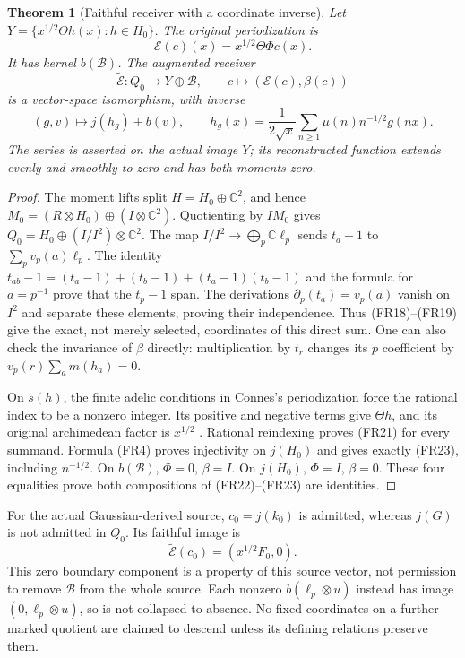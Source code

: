 \documentclass[11pt]{article}
\newtheorem{theorem}{Theorem}
\newcommand{\C}{\mathbb C}\newcommand{\R}{\mathbb R}
\begin{document}
\begin{theorem}[Faithful receiver with a coordinate inverse]
Let $Y=\{x^{1/2}\Theta h(x):h\in H_0\}$. The original periodization is
\begin{equation}
 \mathcal E(c)(x)=x^{1/2}\Theta\Phi c(x).
 \tag{FR21}
\end{equation}
It has kernel $b(\mathcal B)$. The augmented receiver
\begin{equation}
 \widetilde{\mathcal E}:Q_0\longrightarrow Y\oplus\mathcal B,
 \qquad c\longmapsto(\mathcal E(c),\beta(c))
 \tag{FR22}
\end{equation}
is a vector-space isomorphism, with inverse
\begin{equation}
 (g,v)\longmapsto j(h_g)+b(v),\qquad
 h_g(x)=\frac{1}{2\sqrt{x}}\sum_{n\geq1}\mu(n)n^{-1/2}g(nx).
 \tag{FR23}
\end{equation}
The series is asserted on the actual image $Y$; its reconstructed function extends evenly and smoothly to zero and has both moments zero.
\end{theorem}
\begin{proof}
The moment lifts split $H=H_0\oplus\C^2$, and hence
$M_0=(R\otimes H_0)\oplus(I\otimes\C^2)$. Quotienting by $IM_0$ gives
$Q_0=H_0\oplus(I/I^2)\otimes\C^2$.
The map $I/I^2\to\bigoplus_p\C\ell_p$ sends $t_a-1$ to $\sum_pv_p(a)\ell_p$.
The identity $t_{ab}-1=(t_a-1)+(t_b-1)+(t_a-1)(t_b-1)$ and the formula for $a=p^{-1}$ prove that the $t_p-1$ span. The derivations $\partial_p(t_a)=v_p(a)$ vanish on $I^2$ and separate these elements, proving their independence. Thus (FR18)--(FR19) give the exact, not merely selected, coordinates of this direct sum. One can also check the invariance of $\beta$ directly: multiplication by $t_r$ changes its $p$ coefficient by $v_p(r)\sum_a m(h_a)=0$.

On $s(h)$, the finite adelic conditions in Connes's periodization force the rational index to be a nonzero integer. Its positive and negative terms give $\Theta h$, and its original archimedean factor is $x^{1/2}$ \cite[Section III, (6)--(19)]{Connes}. Rational reindexing proves (FR21) for every summand. Formula (FR4) proves injectivity on $j(H_0)$ and gives exactly (FR23), including $n^{-1/2}$. On $b(\mathcal B)$, $\Phi=0$, $\beta=I$. On $j(H_0)$, $\Phi=I$, $\beta=0$. These four equalities prove both compositions of (FR22)--(FR23) are identities.
\end{proof}

For the actual Gaussian-derived source, $c_0=j(k_0)$ is admitted, whereas $j(G)$ is not admitted in $Q_0$. Its faithful image is
\begin{equation}
 \widetilde{\mathcal E}(c_0)=(x^{1/2}F_0,0).
 \tag{FR24}
\end{equation}
This zero boundary component is a property of this source vector, not permission to remove $\mathcal B$ from the whole source. Each nonzero $b(\ell_p\otimes u)$ instead has image $(0,\ell_p\otimes u)$, so is not collapsed to absence. No fixed coordinates on a further marked quotient are claimed to descend unless its defining relations preserve them.
\end{document}
